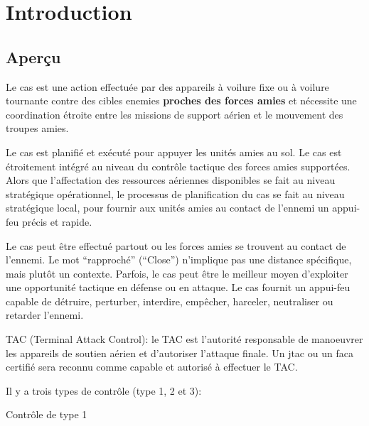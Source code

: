 \chapter{Introduction}

\begin{center}
\end{center}


\section{Aperçu}

\e

    \item
    Le \acrfull{cas} est une action effectuée par des appareils à voilure fixe ou à voilure tournante contre des cibles enemies \textbf{proches des forces amies} et nécessite une coordination étroite entre les missions de support aérien et le mouvement des troupes amies.
    \item
    Le \acrshort{cas} est planifié et exécuté pour appuyer les unités amies au sol. Le \acrshort{cas} est étroitement intégré au niveau du contrôle tactique des forces amies supportées. Alors que l'affectation des ressources aériennes disponibles se fait au niveau stratégique opérationnel, le processus de planification du \acrshort{cas} se fait au niveau stratégique local, pour fournir aux unités amies au contact de l'ennemi un appui-feu précis et rapide.
    \item
    Le \acrshort{cas} peut être effectué partout ou les forces amies se trouvent au contact de l'ennemi. Le mot ``rapproché'' (``Close'') n'implique pas une distance spécifique, mais plutôt un contexte. Parfois, le \acrshort{cas} peut être le meilleur moyen d'exploiter une opportunité tactique en défense ou en attaque. Le \acrshort{cas} fournit un appui-feu capable de détruire, perturber, interdire, empêcher, harceler, neutraliser ou retarder l'ennemi.
    \item
    TAC (Terminal Attack Control): le TAC est l'autorité responsable de manoeuvrer les appareils de soutien aérien et d'autoriser l'attaque finale. Un \acrshort{jtac} ou un \acrshort{faca} certifié sera reconnu comme capable et autorisé à effectuer le TAC.
    \item
    Il y a trois types de contrôle (type 1, 2 et 3):
    \ee
        \item
        Contrôle de type 1

